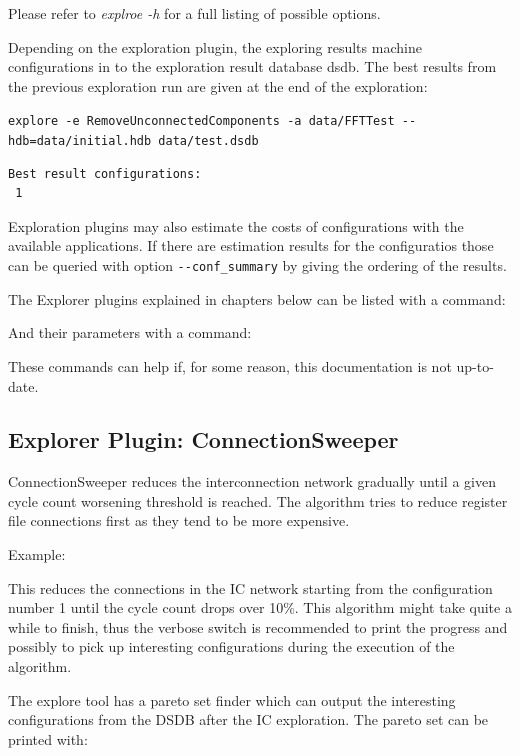 \documentclass[twoside]{tceusermanual}
\begin{document}
Please refer to \textit{explroe -h} for a full listing of possible options.

Depending on the exploration plugin, the exploring results machine
configurations in to the exploration result database dsdb. The best results
from the previous exploration run are given at the end of the exploration:

\verb|explore -e RemoveUnconnectedComponents -a data/FFTTest --hdb=data/initial.hdb data/test.dsdb|

\begin{verbatim}
Best result configurations:
 1
\end{verbatim}
Exploration plugins may also estimate the costs of configurations with the
available applications. If there are estimation results for the configuratios
those can be queried with option \verb|--conf_summary| by giving the
ordering of the results.

The Explorer plugins explained in chapters below can be listed with a command:


And their parameters with a command:


These commands can help if, for some reason, this documentation is not up-to-date.

\subsection{Explorer Plugin: ConnectionSweeper}
\label{ConnectionSweeper}
ConnectionSweeper reduces the interconnection network gradually until a
given cycle count worsening threshold is reached. The algorithm tries to
reduce register file connections first as they tend to be more expensive.

Example:


This reduces the connections in the IC network starting from the configuration 
number 1 until the cycle count drops over 10\%. This algorithm might take 
quite a while to finish, thus the verbose switch is recommended to print 
the progress and possibly to pick up interesting configurations during the 
execution of the algorithm.

The explore tool has a pareto set finder which can output the interesting
configurations from the DSDB after the IC exploration. The pareto set
can be printed with:
\end{document}
